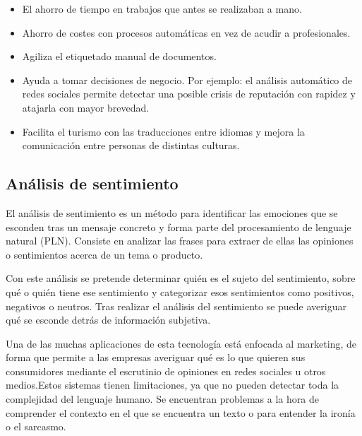 \begin{itemize}
	\item El ahorro de tiempo en trabajos que antes se realizaban a mano.
	\item Ahorro de costes con procesos automáticas en vez de acudir a profesionales.
	\item Agiliza el etiquetado manual de documentos.
	\item Ayuda a tomar decisiones de negocio. Por ejemplo: el análisis automático de redes sociales permite detectar una posible crisis de reputación con rapidez y atajarla con mayor brevedad.
	\item Facilita el turismo con las traducciones entre idiomas y mejora la comunicación entre personas de distintas culturas.
\end{itemize}

\subsection{Análisis de sentimiento} \label{sentiment}

El análisis de sentimiento \citep{sentimientoanalisis} es un método para identificar las emociones que se esconden tras un mensaje concreto y forma parte del procesamiento de lenguaje natural (PLN). Consiste en analizar las frases para extraer de ellas las opiniones o sentimientos acerca de un tema o producto.

Con este análisis \citep{sentanalisis} se pretende determinar quién es el sujeto del sentimiento, sobre qué o quién tiene ese sentimiento y categorizar esos sentimientos como positivos, negativos o neutros. Tras realizar el análisis del sentimiento se puede averiguar qué se esconde detrás de información subjetiva.

Una de las muchas aplicaciones de esta tecnología está enfocada al marketing, de forma que permite a las empresas averiguar qué es lo que quieren sus consumidores mediante el escrutinio de opiniones en redes sociales u otros medios.Estos sistemas tienen limitaciones, ya que no pueden detectar toda la complejidad del lenguaje humano. Se encuentran problemas a la hora de comprender el contexto en el que se encuentra un texto o para entender la ironía o el sarcasmo.

